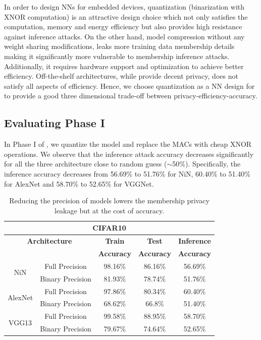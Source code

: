 In order to design NNs for embedded devices, quantization (binarization with XNOR computation) is an attractive design choice which not only satisfies the computation, memory and energy efficiency but also provides high resistance against inference attacks.
On the other hand, model compression without any weight sharing modifications, leaks more training data membership details making it significantly more vulnerable to membership inference attacks. Additionally, it requires hardware support and optimization to achieve better efficiency.
Off-the-shelf architectures, while provide decent privacy, does not satisfy all aspects of efficiency.
Hence, we choose quantization as a NN design for \method\hspace{0.01in} to provide a good three dimensional trade-off between privacy-efficiency-accuracy.




\subsection{Evaluating Phase I}
\label{evalPh1}

In Phase I of \method, we quantize the model and replace the MACs with cheap XNOR operations.
We observe that the inference attack accuracy decreases significantly for all the three architecture close to random guess ($\sim$50\%).
Specifically, the inference accuracy decreases from 56.69\% to 51.76\% for NiN, 60.40\% to 51.40\% for AlexNet and 58.70\% to 52.65\% for VGGNet.


\begin{table}[!htb]
\begin{center}
\renewcommand\arraystretch{1.5}
\fontsize{6.7pt}{6.7pt}\selectfont
\begin{tabular}{|c|c|c|c|c|}
\hline
\multicolumn{5}{|c|}{\textbf{CIFAR10}} \\
\hline
\multicolumn{2}{|c|}{\textbf{Architecture}} & \textbf{Train}  & \textbf{Test}  & \textbf{Inference}  \\
 \multicolumn{2}{|c|}{} & \textbf{Accuracy} & \textbf{Accuracy} & \textbf{Accuracy}  \\
\hline
\multirow{2}{*}{NiN} & Full Precision & 98.16\% & 86.16\% & \cellcolor{red!25}56.69\% \\
& Binary Precision & 81.93\% & 78.74\% & \cellcolor{green!25}51.76\% \\
\hline
\multirow{2}{*}{AlexNet} & Full Precision & 97.86\% & 80.34\% & \cellcolor{red!25}60.40\% \\
& Binary Precision & 68.62\% & 66.8\% & \cellcolor{green!25}51.40\% \\
\hline
\multirow{2}{*}{VGG13} & Full Precision & 99.58\% & 88.95\% & \cellcolor{red!25}58.70\%\\
& Binary Precision & 79.67\% & 74.64\% & \cellcolor{green!25}52.65\%\\
\hline
\end{tabular}
\end{center}
\caption{Reducing the precision of models lowers the membership privacy leakage but at the cost of accuracy.}
\label{cifar10quant}
\end{table}



